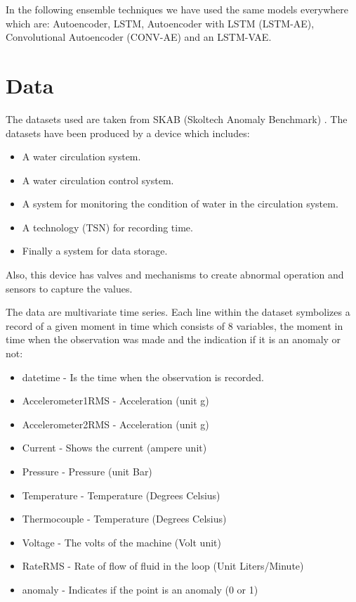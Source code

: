 \documentclass[a4paper,12pt]{report}
\theoremstyle{definitionNODot}
\begin{document}
	In the following ensemble techniques we have used the same models everywhere which are: Autoencoder, LSTM, Autoencoder with LSTM (LSTM-AE), Convolutional Autoencoder (CONV-AE) and an LSTM-VAE.
	\section{Data}
	
	The datasets used are taken from SKAB (Skoltech Anomaly Benchmark) \cite{skabdataset}. The datasets have been produced by a device which includes:
	
	\begin{itemize}
		\item A water circulation system.
		\item A water circulation control system.
		\item A system for monitoring the condition of water in the circulation system.
		\item A technology (TSN) for recording time.
		\item Finally a system for data storage.
	\end{itemize}
	Also, this device has valves and mechanisms to create abnormal operation and sensors to capture the values.
	
	The data are multivariate time series. Each line within the dataset symbolizes a record of a given moment in time which consists of 8 variables, the moment in time when the observation was made and the indication if it is an anomaly or not:
	
	\begin{itemize}
		\item datetime - Is the time when the observation is recorded.
		\item Accelerometer1RMS - Acceleration (unit g)
		\item Accelerometer2RMS - Acceleration (unit g)
		\item Current - Shows the current (ampere unit)
		\item Pressure - Pressure (unit Bar)
		\item Temperature - Temperature (Degrees Celsius)
		\item Thermocouple - Temperature (Degrees Celsius)
		\item Voltage - The volts of the machine (Volt unit)
		\item RateRMS - Rate of flow of fluid in the loop (Unit Liters/Minute)
		\item anomaly - Indicates if the point is an anomaly (0 or 1)
	\end{itemize}
	
\end{document}
